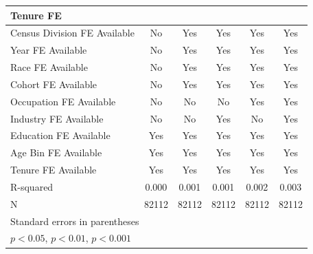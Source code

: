 {\begin{tabular}{l*{5}{c}}
Tenure FE           &                     &                     &                     &                     &                     \\
\midrule Census Division FE Available&          No         &         Yes         &         Yes         &         Yes         &         Yes         \\
Year FE Available   &          No         &         Yes         &         Yes         &         Yes         &         Yes         \\
Race FE Available   &          No         &         Yes         &         Yes         &         Yes         &         Yes         \\
Cohort FE Available &          No         &         Yes         &         Yes         &         Yes         &         Yes         \\
Occupation FE Available&          No         &          No         &          No         &         Yes         &         Yes         \\
Industry FE Available&          No         &          No         &         Yes         &          No         &         Yes         \\
Education FE Available&         Yes         &         Yes         &         Yes         &         Yes         &         Yes         \\
Age Bin FE Available&         Yes         &         Yes         &         Yes         &         Yes         &         Yes         \\
Tenure FE Available &         Yes         &         Yes         &         Yes         &         Yes         &         Yes         \\
R-squared           &       0.000         &       0.001         &       0.001         &       0.002         &       0.003         \\
N                   &       82112         &       82112         &       82112         &       82112         &       82112         \\
\hline\hline
\multicolumn{6}{l}{\footnotesize Standard errors in parentheses}\\
\multicolumn{6}{l}{\footnotesize \sym{*} \(p<0.05\), \sym{**} \(p<0.01\), \sym{***} \(p<0.001\)}\\
\end{tabular}
}
